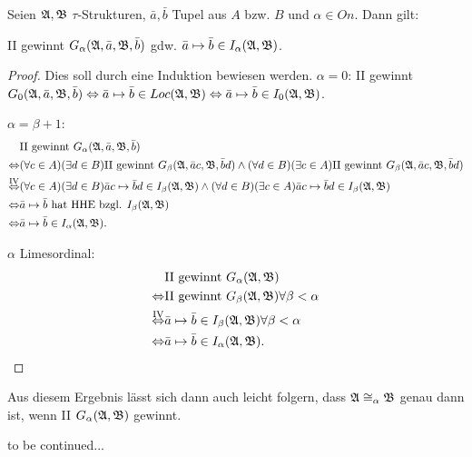 \begin{lemma}
	Seien $\mathfrak{A},\mathfrak{B}$ $\tau$-Strukturen, $\bar{a},\bar{b}$ Tupel aus $A$ bzw. $B$ und $\alpha\in On$. Dann gilt:
	
	II gewinnt $G_\alpha(\mathfrak{A},\bar{a},\mathfrak{B},\bar{b})$ gdw. $\bar{a}\mapsto\bar{b}\in I_\alpha(\mathfrak{A},\mathfrak{B})$.
\end{lemma}
\begin{proof}
	Dies soll durch eine Induktion bewiesen werden.
	$\alpha=0$: II gewinnt $G_0(\mathfrak{A},\bar{a},\mathfrak{B},\bar{b}) \Leftrightarrow \bar{a}\mapsto\bar{b}\in Loc(\mathfrak{A},\mathfrak{B}) \Leftrightarrow \bar{a}\mapsto\bar{b}\in I_0(\mathfrak{A},\mathfrak{B})$.
	
	$\alpha=\beta+1$:
	\begin{align*}
		&\text{II gewinnt } G_\alpha(\mathfrak{A},\bar{a},\mathfrak{B},\bar{b}) \\
		\Leftrightarrow & (\forall c \in A)(\exists d\in B) \text{II gewinnt } G_\beta(\mathfrak{A},\bar{a}c,\mathfrak{B},\bar{b}d) \land (\forall d \in B)(\exists c\in A) \text{II gewinnt } G_\beta(\mathfrak{A},\bar{a}c,\mathfrak{B},\bar{b}d) \\
		\overset{\text{IV}}{\Leftrightarrow} & (\forall c \in A)(\exists d\in B) \bar{a}c\mapsto\bar{b}d\in I_\beta(\mathfrak{A},\mathfrak{B}) \land (\forall d \in B)(\exists c\in A) \bar{a}c\mapsto\bar{b}d\in I_\beta(\mathfrak{A},\mathfrak{B}) \\
		\Leftrightarrow& \bar{a}\mapsto\bar{b} \text{ hat HHE bzgl. } I_\beta(\mathfrak{A},\mathfrak{B}) \\
		\Leftrightarrow& \bar{a}\mapsto \bar{b}\in I_\alpha(\mathfrak{A},\mathfrak{B}).
	\end{align*}
	
	$\alpha$ Limesordinal:
	\begin{align*}
		&\text{II gewinnt } G_\alpha(\mathfrak{A},\mathfrak{B}) \\
		\Leftrightarrow & \text{II gewinnt } G_\beta(\mathfrak{A},\mathfrak{B}) \forall \beta <\alpha \\
		\overset{\text{IV}}{\Leftrightarrow}& \bar{a}\mapsto\bar{b} \in I_\beta(\mathfrak{A},\mathfrak{B}) \forall \beta<\alpha \\
		\Leftrightarrow & \bar{a}\mapsto\bar{b}\in I_\alpha(\mathfrak{A},\mathfrak{B}).
	\end{align*}
\end{proof}

Aus diesem Ergebnis lässt sich dann auch leicht folgern, dass $\mathfrak{A}\cong_\alpha\mathfrak{B}$ genau dann ist, wenn II $G_\alpha(\mathfrak{A},\mathfrak{B})$ gewinnt.

\begin{satz}
	to be continued...
\end{satz}


















